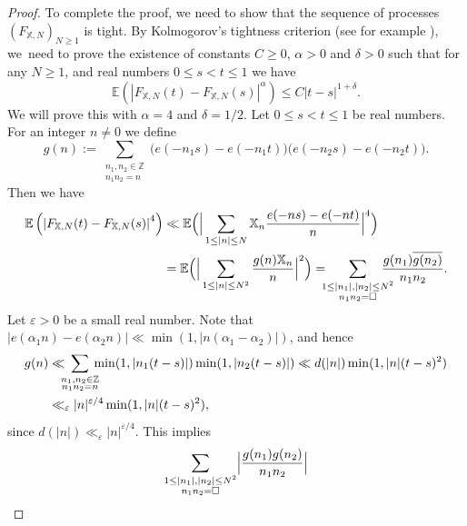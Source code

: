 \documentclass[JEP,XML,SOM,Unicode,NoFloatCountersInSection,published]{cedram}
\theoremstyle{plain}
\theoremstyle{definition}
\let\ep\varepsilon
\newcommand{\X}{\mathbb{X}}
\newcommand{\ex}{\mathbb{E}}
\begin{document}
\begin{proof}
To complete the proof, we need to show that the sequence of processes $(F_{\X, N})_{N\geq 1}$ is tight. By Kolmogorov's tightness criterion (see for example \cite[Prop.\,B.11.10]{Ko}), we~need to prove the existence of constants $C\geq 0$, $\alpha>0$ and $\delta>0$ such that for any $N\geq 1$, and real numbers $0\leq s<t\leq 1$ we have
\[\ex\left(\left|F_{\X, N}(t)-F_{\X, N}(s)\right|^{\alpha}\right)\leq C |t-s|^{1+\delta}.\]
We will prove this with $\alpha=4$ and $\delta= 1/2.$ Let $0\leq s<t\leq 1$ be real numbers. For an integer $n\neq 0$ we define
\begin{equation}\label{Definitiong}
g(n):= \sum_{\substack{n_1, n_2 \in \mathbb{Z}\\ n_1n_2=n}} \big(e(-n_1s)-e(-n_1t)\big)\big(e(-n_2s)-e(-n_2t)\big).
\end{equation}
Then we have
\begin{equation}\label{eq: Bound4thMomentPartialRandom}
\begin{aligned}
\ex\left(\left|F_{\X, N}(t)-F_{\X, N}(s)\right|^{4}\right)&\ll \ex\Big(\Big|\sum_{1\leq |n|\leq N} \X_n \frac{e(-ns)-e(-nt)}{n}\Big|^4\Big)\\
& = \ex\Big(\Big|\sum_{1\leq |n|\leq N^2} \frac{g(n) \X_n }{n}\Big|^2\Big) = \hspace*{-2mm}\sum_{\substack{1\leq |n_1|, |n_2|\leq N^2\\ n_1n_2=\square}}\hspace*{-4mm} \frac{g(n_1)\overline{g(n_2)}}{n_1n_2}.
\end{aligned}
\end{equation}
Let $\ep>0$ be a small real number. Note that $|e(\alpha_1 n)-e(\alpha_2 n)|\ll \min(1, |n(\alpha_1-\alpha_2)|)$, and hence
\begin{equation}\label{EstimateGn}
\begin{aligned}
g(n)&\ll\hspace*{-2mm} \sum_{\substack{n_1, n_2 \in \mathbb{Z}\\ n_1n_2=n}}\hspace*{-2mm} \min(1, |n_1(t-s)|)\min(1, |n_2(t-s)|)\ll d(|n|)\min(1, |n|(t-s)^2)\\
&\ll_{\ep} |n|^{\ep/4}\min(1, |n|(t-s)^2),
\end{aligned}
\end{equation}
since $d(|n|)\ll_{\ep} |n|^{\ep/4}.$
This implies
\begin{align*}
\sum_{\substack{1\leq |n_1|, |n_2|\leq N^2\\ n_1n_2=\square}} \Bigl|\frac{g(n_1)g(n_2)}{n_1n_2}\Bigr|

\end{align*}
\end{proof}
\end{document}
